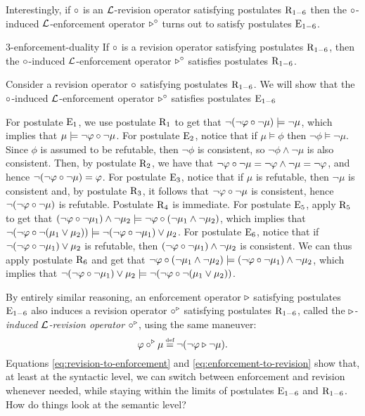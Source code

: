 Interestingly,
if $\circ$ is an $\mathcal{L}$-revision operator satisfying postulates $\mathrm{R}_{1-6}$
then the $\circ$-induced $\mathcal{L}$-enforcement operator $\triangleright^{\circ}$
turns out to satisfy postulates $\mathrm{E}_{1-6}$.

\begin{prp}{\cite{HaretWW18}}{3-enforcement-duality}
	If $\circ$ is a revision operator satisfying postulates $\mathrm{R}_{1-6}$,
	then the $\circ$-induced $\mathcal{L}$-enforcement operator $\triangleright^\circ$ 
	satisfies postulates $\mathrm{R}_{1-6}$.
\end{prp}
\begin{prf*}{}{}%
	Consider a revision operator $\circ$ satisfying postulates $\mathrm{R}_{1-6}$.
	We will show that the $\circ$-induced $\mathcal{L}$-enforcement operator 
	$\triangleright^\circ$ satisfies postulates $\mathrm{E}_{1-6}$

    For postulate $\mathrm{E}_{1}$, we use postulate $\mathrm{R}_{1}$ to get that
    $\lnot(\lnot\varphi\circ\lnot\mu)\models\lnot\mu$,
    which implies that
    $\mu\models\lnot\varphi\circ\lnot\mu$.
    For postulate $\mathrm{E}_{2}$, notice that
    if $\mu\models \phi$
    then $\lnot \phi \models\lnot\mu$.
    Since $\phi$ is assumed to be refutable,
    then $\lnot \phi$ is consistent,
    so $\lnot \phi\land\lnot\mu$ is also consistent.
    Then, by postulate $\mathrm{R}_{2}$, we have that
    $\lnot\varphi\circ\lnot\mu=\lnot \varphi\land\lnot\mu=\lnot \varphi$,
    and hence $\lnot(\lnot\varphi\circ\lnot \mu)=\varphi$.
    For postulate $\mathrm{E}_{3}$, notice that
    if $\mu$ is refutable,
    then $\lnot\mu$ is consistent
    and, by postulate $\mathrm{R}_{3}$,
    it follows that $\lnot\varphi\circ\lnot\mu$ is consistent,
    hence $\lnot(\lnot\varphi\circ\lnot\mu)$ is refutable.
    Postulate $\mathrm{R}_{4}$ is immediate.
    For postulate $\mathrm{E}_{5}$, apply $\mathrm{R}_{5}$ to get that
    $(\lnot \varphi\circ\lnot \mu_1)\land\lnot\mu_2\models\lnot \varphi\circ(\lnot\mu_1\land\lnot\mu_2)$,
    which implies that
    $\lnot(\lnot \varphi\circ\lnot(\mu_1\lor\mu_2))\models\lnot(\lnot \varphi\circ\lnot \mu_1)\lor\mu_2$.
    For postulate $\mathrm{E}_{6}$, notice that if
    $\lnot(\lnot\varphi\circ\lnot\mu_1)\lor\mu_2$ is refutable,
    then $(\lnot\varphi\circ\lnot\mu_1)\land\lnot\mu_2$ is consistent.
    We can thus apply postulate $\mathrm{R}_{6}$ and get that
    $\lnot\varphi\circ(\lnot\mu_1\land\lnot\mu_2)\models(\lnot\varphi\circ\lnot\mu_1)\land\lnot\mu_2$,
    which implies that
    $\lnot(\lnot\varphi\circ\lnot\mu_1)\lor\mu_2\models\lnot(\lnot \varphi\circ\lnot(\mu_1\lor\mu_2))$.
\end{prf*}

By entirely similar reasoning, an enforcement operator $\triangleright$ 
satisfying postulates $\mathrm{E}_{1-6}$
also induces a revision operator $\circ^\triangleright$
satisfying postulates $\mathrm{R}_{1-6}$,
called the \emph{$\triangleright$-induced $\mathcal{L}$-revision operator $\circ^\triangleright$},
using the same maneuver:
\begin{equation}\label{eq:enforcement-to-revision}
	\phi\re^\en\mu \defeq \lnot(\lnot\phi\en\lnot\mu).
\end{equation}
Equations \ref{eq:revision-to-enforcement} and 
\ref{eq:enforcement-to-revision} show that, at least at the syntactic level,
we can switch between enforcement and revision whenever needed, 
while staying within the limits of postulates $\mathrm{E}_{1-6}$
and $\mathrm{R}_{1-6}$.
How do things look at the semantic level?

